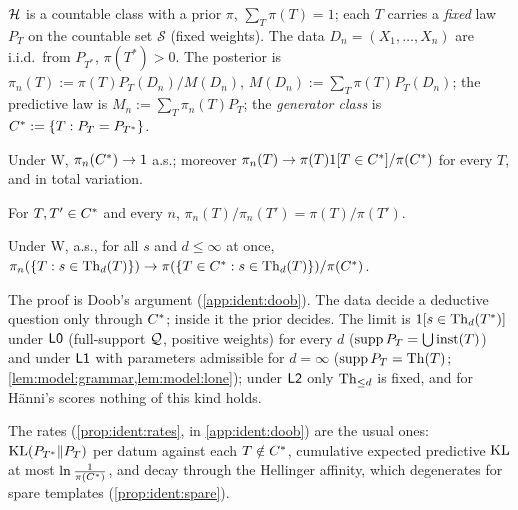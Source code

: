 \begin{definition}[Setting W]\label{def:ident:W}
$\mathcal{H}$ is a countable class with a prior $\pi$, $\sum_T\pi(T)=1$; each $T$ carries a \emph{fixed} law $P_T$ on the countable set $\mathcal S$ (fixed weights). The data $D_n=(X_1,\dots,X_n)$ are i.i.d.\ from $P_{T^*}$, $\pi(T^*)>0$. The posterior is $\pi_n(T):=\pi(T)P_T(D_n)/M(D_n)$, $M(D_n):=\sum_T\pi(T)P_T(D_n)$; the predictive law is $M_n:=\sum_T\pi_n(T)P_T$; the \emph{generator class} is $C^{*}:=\{T:P_T=P_{T^*}\}$.
\end{definition}

\begin{theorem}\label{thm:ident:doob}
Under W, $\pi_n(C^{*})\to1$ a.s.; moreover $\pi_n(T)\to\pi(T)1[T\in C^{*}]/\pi(C^{*})$ for every $T$, and in total variation.
\end{theorem}

\begin{corollary}\label{cor:ident:prior}
For $T,T'\in C^{*}$ and every $n$, $\pi_n(T)/\pi_n(T')=\pi(T)/\pi(T')$.
\end{corollary}

\begin{corollary}\label{cor:ident:deductive}
Under W, a.s., for all $s$ and $d\le\infty$ at once, $\pi_n(\{T:s\in\mathrm{Th}_d(T)\})\to\pi(\{T\in C^{*}:s\in\mathrm{Th}_d(T)\})/\pi(C^{*})$.
\end{corollary}

\noindent The proof is Doob's argument \citep{doob1949application} (\cref{app:ident:doob}). The data decide a deductive question only through $C^{*}$; inside it the prior decides. The limit is $1[s\in\mathrm{Th}_d(T^*)]$ under $\mathord{\mathsf{L0}}$ (full-support $\mathcal{Q}$, positive weights) for every $d$ ($\operatorname{supp}P_T=\bigcup\mathrm{inst}(T)$) and under $\mathord{\mathsf{L1}}$ with parameters admissible for $d=\infty$ ($\operatorname{supp}P_T=\mathrm{Th}(T)$; \cref{lem:model:grammar,lem:model:lone}); under $\mathord{\mathsf{L2}}$ only $\mathrm{Th}_{\le d}$ is fixed, and for H\"anni's scores nothing of this kind holds.

\noindent The rates (\cref{prop:ident:rates}, in \cref{app:ident:doob}) are the usual ones: $\mathrm{KL}(P_{T^*}\|P_T)$ per datum against each $T\notin C^{*}$, cumulative expected predictive $\mathrm{KL}$ at most $\ln\frac1{\pi(C^{*})}$, and decay through the Hellinger affinity, which degenerates for spare templates (\cref{prop:ident:spare}).

